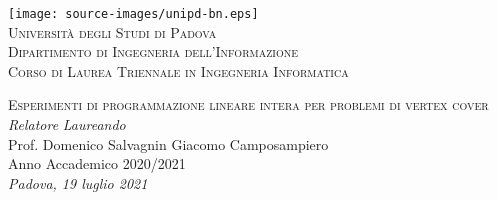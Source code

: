 \documentclass[a4paper,12pt,parskip=half]{book}
\begin{document}
\begin{titlepage}

	\begin{center}
	
	\texttt{[image: source-images/unipd-bn.eps]} \\ %
	\vspace{0.4cm}
	\textsc{\LARGE Università degli Studi di Padova}\\
	\vspace{0.25cm}
	\textsc{\normalsize Dipartimento di Ingegneria dell'Informazione}\\
	\vspace{0.25cm}
	\textsc{\normalsize Corso di Laurea Triennale in Ingegneria Informatica}
	
	\vfill
	\textsc{\LARGE Esperimenti di programmazione lineare intera per problemi di vertex cover}\\

	\vfill
	\vspace*{4cm}
	\textsl{\large Relatore} \hfill \textsl{\large Laureando}\\
	\large Prof. Domenico Salvagnin \hfill Giacomo Camposampiero\\
	
	\vfill
	{\large Anno Accademico 2020/2021}\\
	\textsl{\large Padova, 19 luglio 2021}
	\end{center}
\end{titlepage}


\thispagestyle{empty} %
\cleardoublepage

\thispagestyle{empty}

\clearpage{\pagestyle{plain}\cleardoublepage}


\clearpage{\pagestyle{plain}\cleardoublepage}
\tableofcontents %

\clearpage{\pagestyle{plain}\cleardoublepage} %

\clearpage{\pagestyle{plain}\cleardoublepage} %
\end{document}
